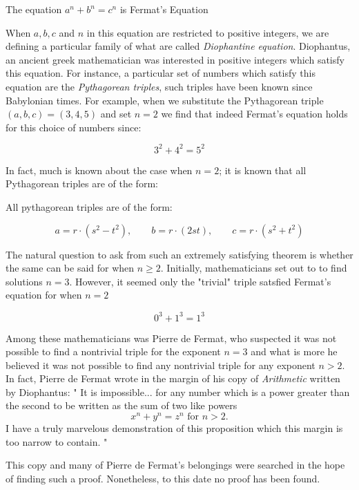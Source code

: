 \begin{definition}
    The equation $a^n + b^n = c^n$ is Fermat's Equation
\end{definition}

When $a, b, c$ and $n$ in this equation are restricted to positive integers, we are defining a particular family of what are called \textit{Diophantine equation}.
Diophantus, an ancient greek mathematician was interested in positive integers which satisfy this equation. For instance, a particular set of numbers which satisfy this equation 
are the \textit{Pythagorean triples}, such triples have been known since Babylonian times. For example, when we substitute the Pythagorean triple $(a,b,c) = (3,4,5)$ and set $n = 2$ we find that 
indeed Fermat's equation holds for this choice of numbers since:

\[
3^2 + 4^2 = 5^2
\]

In fact, much is known about the case when $n = 2$; it is known that all Pythagorean triples are of the form:

\begin{theorem}
    All pythagorean triples are of the form:

    \[
    a = r \cdot (s^2 - t^2), \qquad b = r \cdot (2st), \qquad c = r \cdot (s^2 + t^2)
    \]
\end{theorem}

The natural question to ask from such an extremely satisfying theorem is whether the same can be said for when $n \ge 2$. Initially, mathematicians set out to
to find solutions $n = 3$. However, it seemed only the "trivial" triple satsfied Fermat's equation for when $n = 2$

\[
0^3 + 1^3 = 1^3
\]

Among these mathematicians was Pierre de Fermat, who suspected it was not possible to find a nontrivial triple for the exponent $n= 3$ and what is more he believed
it was not possible to find any nontrivial triple for any exponent $n > 2$. In fact, Pierre de Fermat wrote in the margin of his copy of \textit{Arithmetic} written by Diophantus:
"
It is impossible... for any number which is a power greater than the second to be written as the sum of two like powers 
\[ 
x^n + y^n = z^n \text{ for } n > 2.
\]
I have a truly marvelous demonstration of this proposition which this margin is too narrow to contain.
"

This copy and many of Pierre de Fermat's belongings were searched in the hope of finding such a proof. Nonetheless, to this date no proof has been found.


